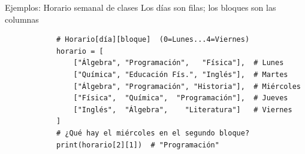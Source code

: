 \documentclass{beamer}
\begin{document}
    \begin{frame}[fragile, t]{Ejemplos: Horario semanal de clases}
        Los días son filas; los bloques son las columnas
        \begin{verbatim}
            # Horario[día][bloque]  (0=Lunes...4=Viernes)
            horario = [
                ["Álgebra", "Programación",   "Física"],  # Lunes
                ["Química", "Educación Fís.", "Inglés"],  # Martes
                ["Álgebra", "Programación", "Historia"],  # Miércoles
                ["Física",  "Química",  "Programación"],  # Jueves
                ["Inglés",  "Álgebra",    "Literatura"]   # Viernes
            ]
            # ¿Qué hay el miércoles en el segundo bloque?
            print(horario[2][1])  # "Programación"
        \end{verbatim}
    \end{frame}

            

\end{document}
